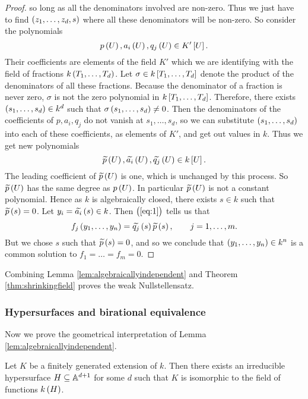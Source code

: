 \begin{proof}
\pagebreak

so long as all the denominators involved are non-zero. Thus we just have to find $ \br{z_1, \dots, z_d, s} $ where all these denominators will be non-zero. So consider the polynomials
$$ p\br{U}, a_i\br{U}, q_j\br{U} \in K'\sbr{U}. $$
Their coefficients are elements of the field $ K' $ which we are identifying with the field of fractions $ k\br{T_1, \dots, T_d} $. Let $ \sigma \in k\sbr{T_1, \dots, T_d} $ denote the product of the denominators of all these fractions. Because the denominator of a fraction is never zero, $ \sigma $ is not the zero polynomial in $ k\sbr{T_1, \dots, T_d} $. Therefore, there exists $ \br{s_1, \dots, s_d} \in k^d $ such that $ \sigma\br{s_1, \dots, s_d} \ne 0 $. Then the denominators of the coefficients of $ p, a_i, q_j $ do not vanish at $ s_1, \dots, s_d $, so we can substitute $ \br{s_1, \dots, s_d} $ into each of these coefficients, as elements of $ K' $, and get out values in $ k $. Thus we get new polynomials
$$ \widetilde{p}\br{U}, \widetilde{a_i}\br{U}, \widetilde{q_j}\br{U} \in k\sbr{U}. $$
The leading coefficient of $ \widetilde{p}\br{U} $ is one, which is unchanged by this process. So $ \widetilde{p}\br{U} $ has the same degree as $ p\br{U} $. In particular $ \widetilde{p}\br{U} $ is not a constant polynomial. Hence as $ k $ is algebraically closed, there exists $ s \in k $ such that $ \widetilde{p}\br{s} = 0 $. Let $ y_i = \widetilde{a_i}\br{s} \in k $. Then $ \br{\ref{eq:1}} $ tells us that
$$ f_j\br{y_1, \dots, y_n} = \widetilde{q_j}\br{s}\widetilde{p}\br{s}, \qquad j = 1, \dots, m. $$
But we chose $ s $ such that $ \widetilde{p}\br{s} = 0 $, and so we conclude that $ \br{y_1, \dots, y_n} \in k^n $ is a common solution to $ f_1 = \dots = f_m = 0 $.
\end{proof}

Combining Lemma \ref{lem:algebraicallyindependent} and Theorem \ref{thm:shrinkingfield} proves the weak Nullstellensatz.

\subsubsection{Hypersurfaces and birational equivalence}

Now we prove the geometrical interpretation of Lemma \ref{lem:algebraicallyindependent}.

\begin{proposition}
\label{prop:irreduciblehypersurface}
Let $ K $ be a finitely generated extension of $ k $. Then there exists an irreducible hypersurface $ H \subseteq \AA^{d + 1} $ for some $ d $ such that $ K $ is isomorphic to the field of functions $ k\br{H} $.
\end{proposition}

